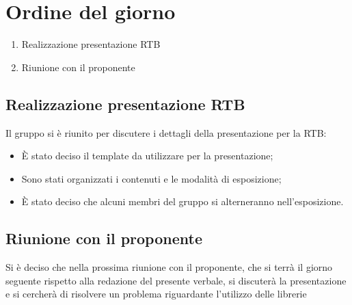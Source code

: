 \section{Ordine del giorno}
\begin{enumerate}
\item Realizzazione presentazione RTB
\item Riunione con il proponente
\end{enumerate}

\subsection{Realizzazione presentazione RTB}
Il gruppo si è riunito per discutere i dettagli della presentazione per la RTB:
\begin{itemize}
    \item È stato deciso il template da utilizzare per la presentazione;
    \item Sono stati organizzati i contenuti e le modalità di esposizione;
    \item È stato deciso che alcuni membri del gruppo si alterneranno nell'esposizione.
\end{itemize}
\subsection{Riunione con il proponente}
Si è deciso che nella prossima riunione con il proponente, che si terrà il giorno seguente rispetto alla redazione del presente verbale, si discuterà la presentazione e si cercherà di risolvere un problema riguardante l'utilizzo delle librerie